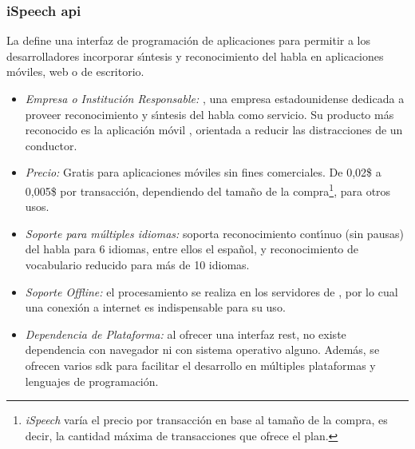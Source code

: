 \subsubsection{iSpeech \gls{api}}
\label{sec:ispeech}

La  \cite{iSpeech} define una interfaz de programaci\'on de aplicaciones para 
permitir a los desarrolladores incorporar s{\'\i}ntesis y reconocimiento del habla en aplicaciones 
m\'oviles, web o de escritorio.

\begin{itemize}
	\item \emph{Empresa o Instituci\'on Responsable:} , una empresa estadounidense dedicada a
	proveer reconocimiento y s{\'\i}ntesis del habla como servicio. Su producto m\'as reconocido es la aplicaci\'on m\'ovil
	, orientada a reducir las distracciones de un conductor.
	\item \emph{Precio:} Gratis para aplicaciones m\'oviles sin fines comerciales. De 0,02\$ a 0,005\$ por
        transacci\'on, dependiendo del tama\~no de la compra\footnote{\emph{iSpeech} var\'ia el precio por transacci\'on
    en base al tama\~no de la compra, es decir, la cantidad m\'axima de transacciones que ofrece el plan.}, para otros usos.
	\item \emph{Soporte para m\'ultiples idiomas:} soporta reconocimiento cont{\'\i}nuo (sin pausas) del habla para 6 idiomas,
	entre ellos el espa\~nol, y reconocimiento de vocabulario reducido para m\'as de 10 idiomas.
	\item \emph{Soporte Offline:} el procesamiento se realiza en los servidores de , por lo cual
	una conexi\'on a internet es indispensable para su uso.
	\item \emph{Dependencia de Plataforma:} al ofrecer una interfaz \gls{rest}, no existe dependencia con navegador
	ni con sistema operativo alguno. Adem\'as, se ofrecen varios \gls{sdk} para facilitar
	el desarrollo en m\'ultiples plataformas y lenguajes de programaci\'on.
\end{itemize}